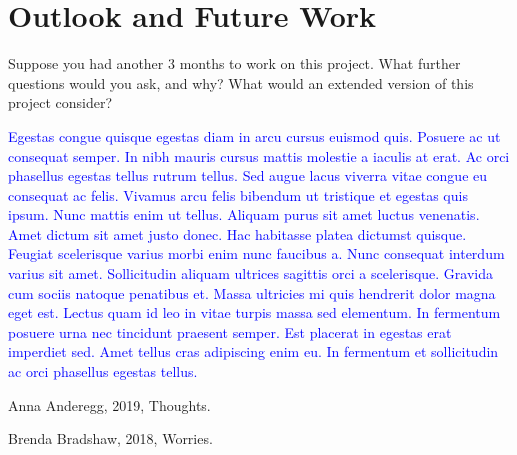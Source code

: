 \documentclass[%
 reprint,
superscriptaddress,
 amsmath,amssymb,
 aps,
]{revtex4-2}
\begin{document}
\section{Outlook and Future Work}

Suppose you had another 3 months to work on this project. What further questions would you ask, and why? What would an extended version of this project consider? 

\textcolor{blue}{Egestas congue quisque egestas diam in arcu cursus euismod quis. Posuere ac ut consequat semper. In nibh mauris cursus mattis molestie a iaculis at erat. Ac orci phasellus egestas tellus rutrum tellus. Sed augue lacus viverra vitae congue eu consequat ac felis. Vivamus arcu felis bibendum ut tristique et egestas quis ipsum. Nunc mattis enim ut tellus. Aliquam purus sit amet luctus venenatis. Amet dictum sit amet justo donec. Hac habitasse platea dictumst quisque. Feugiat scelerisque varius morbi enim nunc faucibus a. Nunc consequat interdum varius sit amet. Sollicitudin aliquam ultrices sagittis orci a scelerisque. Gravida cum sociis natoque penatibus et. Massa ultricies mi quis hendrerit dolor magna eget est. Lectus quam id leo in vitae turpis massa sed elementum. In fermentum posuere urna nec tincidunt praesent semper. Est placerat in egestas erat imperdiet sed. Amet tellus cras adipiscing enim eu. In fermentum et sollicitudin ac orci phasellus egestas tellus.}


\begin{thebibliography}{2}

 Anna Anderegg, 2019, Thoughts.

 Brenda Bradshaw, 2018, Worries.

\end{thebibliography}
\end{document}
